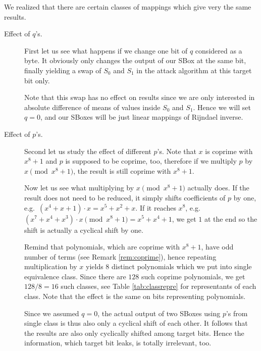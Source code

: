 \begin{remark}
\label{rem:pqeffect}
	We realized that there are certain classes of mappings which give very the same results.
	\begin{description}
		\item[Effect of $q$'s.]
			First let us see what happens if we change one bit of $q$ considered as a byte. It obviously only changes the output of our SBox at the same bit, finally yielding a swap of $S_0$ and $S_1$ in the attack algorithm at this target bit only.
			
			Note that this swap has no effect on results since we are only interested in absolute difference of means of values inside $S_0$ and $S_1$. Hence we will set $q = 0$, and our SBoxes will be just linear mappings of Rijndael inverse.
		
		\item[Effect of $p$'s.]
			Second let us study the effect of different $p$'s. Note that $x$ is coprime with $x^8+1$ and $p$ is supposed to be coprime, too, therefore if we multiply $p$ by $x\pmod{x^8+1}$, the result is still coprime with $x^8+1$.
			
			Now let us see what multiplying by $x\pmod{x^8+1}$ actually does. If the result does not need to be reduced, it simply shifts coefficients of $p$ by one, e.g.\ $(x^4 + x + 1) \cdot x = x^5 + x^2 + x$. If it reaches $x^8$, e.g.\ $(x^7 + x^4 + x^3) \cdot x \pmod{x^8+1} = x^5 + x^4 + 1$, we get $1$ at the end so the shift is actually a cyclical shift by one.
			
			Remind that polynomials, which are coprime with $x^8+1$, have odd number of terms (see Remark \ref{rem:coprime}), hence repeating multiplication by $x$ yields $8$ distinct polynomials which we put into single equivalence class. Since there are $128$ such coprime polynomials, we get $128/8=16$ such classes, see Table \ref{tab:classrepre} for representants of each class. Note that the effect is the same on bits representing polynomials.
			
			Since we assumed $q = 0$, the actual output of two SBoxes using $p$'s from single class is thus also only a cyclical shift of each other. It follows that the results are also only cyclically shifted among target bits. Hence the information, which target bit leaks, is totally irrelevant, too.
	\end{description}
\end{remark}

